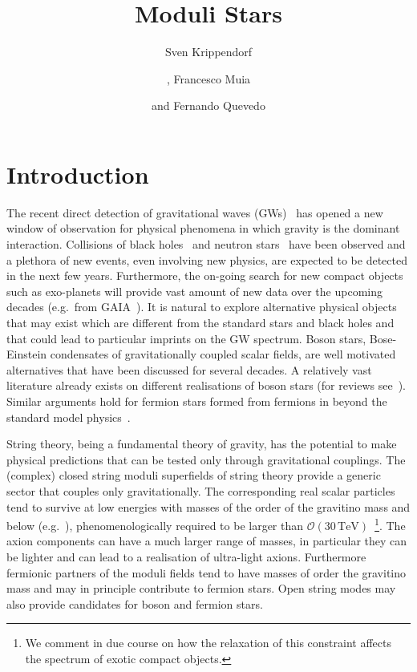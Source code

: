 \documentclass[11pt,a4paper]{article}
\title{Moduli Stars}
\author[1]{Sven Krippendorf}
\author[2]{, Francesco Muia}
\author[2,3]{and Fernando Quevedo}
\affiliation[1]{\small \it Arnold Sommerfeld Center for Theoretical Physics, LMU, Theresienstr. 37, 80333 M\"unchen, Germany}
\affiliation[2]{\small \it ICTP, Strada Costiera 11, Trieste 34014, Italy}
\affiliation[3]{\small \it DAMTP, Centre for Mathematical Sciences, Wilberforce Road, Cambridge, CB3 0WA, UK}
\begin{document}
 
\maketitle

\section{Introduction}

The recent direct detection of gravitational waves (GWs)~\cite{Abbott:2016blz} has opened a new window of observation for physical phenomena in which gravity is the dominant interaction. Collisions of black holes~\cite{Abbott:2016nmj, Abbott:2017vtc, Abbott:2017gyy, Abbott:2017oio} and neutron stars~\cite{TheLIGOScientific:2017qsa} have been observed and a plethora of new events, even involving new physics, are expected to be detected in the next few years. Furthermore, the on-going search for new compact objects such as exo-planets will provide vast amount of new data over the upcoming decades (e.g.~from GAIA~\cite{gaia}). It is natural to explore alternative physical objects that may exist which are different from the standard stars and black holes and that could lead to particular imprints on the GW spectrum. Boson stars, Bose-Einstein condensates of gravitationally coupled scalar fields, are well motivated alternatives that have been discussed for several decades. A relatively vast literature already exists  on different realisations of boson stars (for reviews see~\cite{Jetzer:1991jr,Liddle:1993ha,Schunck:2003kk,1202.5809}). Similar arguments hold for fermion stars formed from fermions in beyond the standard model physics~\cite{Narain:2006kx}.

String theory, being a fundamental theory of gravity, has the potential to make physical predictions that can be tested only through gravitational couplings. The (complex) closed string moduli superfields of string theory provide a generic sector that couples only gravitationally. The corresponding real scalar particles tend to survive at low energies with masses of the order of the gravitino mass and below (e.g.~\cite{deCarlos:1993wie, GomezReino:2006dk}), phenomenologically required to be larger than $	\mathcal{O} (30 \, \text{TeV})$~\cite{Coughlan:1983ci, Banks:1993en, deCarlos:1993wie}\footnote{We comment in due course on how the relaxation of this constraint affects the spectrum of exotic compact objects.}. The axion components can have a much larger range of masses, in particular they can be lighter and can lead to a realisation of ultra-light axions. Furthermore fermionic partners of the moduli fields tend to have masses of order the gravitino mass and may in principle contribute to fermion stars. Open string modes may also provide candidates for boson and fermion stars.
\end{document}
